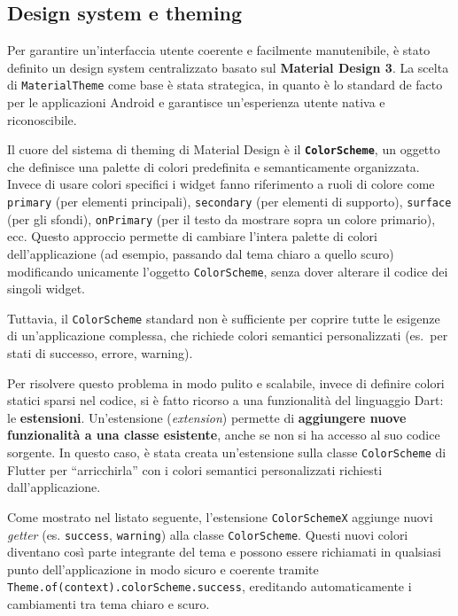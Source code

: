 \subsection{Design system e theming}\label{subsec:design-system-e-theming}
Per garantire un'interfaccia utente coerente e facilmente manutenibile, è stato definito un design system centralizzato basato sul \textbf{Material Design 3}.
La scelta di \texttt{MaterialTheme} come base è stata strategica, in quanto è lo standard de facto per le applicazioni Android e garantisce un'esperienza utente nativa e riconoscibile.

Il cuore del sistema di theming di Material Design è il \textbf{\texttt{ColorScheme}}, un oggetto che definisce una palette di colori predefinita e semanticamente organizzata.
Invece di usare colori specifici i widget fanno riferimento a ruoli di colore come \texttt{primary} (per elementi principali), \texttt{secondary} (per elementi di supporto), \texttt{surface} (per gli sfondi), \texttt{onPrimary} (per il testo da mostrare sopra un colore primario), ecc\@.
Questo approccio permette di cambiare l'intera palette di colori dell'applicazione (ad esempio, passando dal tema chiaro a quello scuro) modificando unicamente l'oggetto \texttt{ColorScheme}, senza dover alterare il codice dei singoli widget.

Tuttavia, il \texttt{ColorScheme} standard non è sufficiente per coprire tutte le esigenze di un'applicazione complessa, che richiede colori semantici personalizzati (es.\ per stati di successo, errore, warning).

Per risolvere questo problema in modo pulito e scalabile, invece di definire colori statici sparsi nel codice, si è fatto ricorso a una funzionalità del linguaggio Dart: le \textbf{estensioni}.
Un'estensione (\emph{extension}) permette di \textbf{aggiungere nuove funzionalità a una classe esistente}, anche se non si ha accesso al suo codice sorgente.
In questo caso, è stata creata un'estensione sulla classe \texttt{ColorScheme} di Flutter per ``arricchirla'' con i colori semantici personalizzati richiesti dall'applicazione.

Come mostrato nel listato seguente, l'estensione \texttt{ColorSchemeX} aggiunge nuovi \emph{getter} (es. \texttt{success}, \texttt{warning}) alla classe \texttt{ColorScheme}.
Questi nuovi colori diventano così parte integrante del tema e possono essere richiamati in qualsiasi punto dell'applicazione in modo sicuro e coerente tramite \texttt{Theme.of(context).colorScheme.success}, ereditando automaticamente i cambiamenti tra tema chiaro e scuro.


